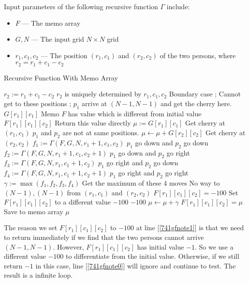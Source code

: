 Input parameters of the following recursive function $\Gamma$ include:
\begin{itemize}
\item $F$ --- The memo array
\item $G, N$ --- The input grid $N\times N$ grid
\item $r_1, c_1, c_2$ --- The position $(r_1, c_1)$ and $(r_2, c_2)$ of the two persons, where $r_2 = r_1+c_1-c_2$
\end{itemize}
\begin{algorithm}[H]
\caption{Recursive Function With Memo Array}
\label{741gf}
\begin{algorithmic}[1]
\State $r_2 := r_1+c_1-c_2$ \Comment $r_2$ is uniquely determined by $r_1,c_1,c_2$
 \Comment Boundary case
\State {};
\EndIf
{} \Comment Cannot get to these positions
\State {};
\EndIf
{} \Comment $p_1$ arrive at $(N-1, N-1)$ and get the cherry here.
\State \Return $G[r_1][c_1]$
\EndIf
{} \Comment Memo $F$ has value which is different from initial value \label{741gfnote0}
\State \Return $F[r_1][c_1][c_2]$ \Comment  Return this value directly
\EndIf
\State $\mu:=G[r_1][c_1]$ \Comment Get cherry at $(r_1, c_1)$
 \Comment $p_1$ and $p_2$ are not at same positions.
\State $\mu\gets \mu+G[r_2][c_2]$ \Comment Get cherry at $(r_2, c_2)$
\EndIf
\State $f_1 := \Gamma(F, G, N, r_1+1, c_1, c_2)$ \Comment $p_1$ go down  and $p_2$ go down
\State $f_2 := \Gamma(F, G, N, r_1+1, c_1, c_2+1)$ \Comment $p_1$ go down  and $p_2$ go right
\State $f_3 := \Gamma(F, G, N, r_1, c_1+1, c_2)$ \Comment $p_1$ go right  and $p_2$ go down
\State $f_4 := \Gamma(F, G, N, r_1, c_1+1, c_2+1)$ \Comment $p_1$ go right  and $p_2$ go right
\State $\gamma := \max(f_1,f_2,f_3,f_4)$ \Comment Get the maximum of these 4 moves
 \Comment No way to $(N-1), (N-1)$ from $(r_1, c_1)$ and $(r_2, c_2)$
\State $F[r_1][c_1][c_2] = -100$ \Comment Set $F[r_1][c_1][c_2]$ to a different value $-100$ \label{741gfnote1}
\State \Return $-100$
\EndIf
\State $\mu\gets \mu + \gamma$
\State $F[r_1][c_1][c_2] =\mu$ \Comment Save to memo array
\State \Return $\mu$
\EndFunction
\end{algorithmic}
\end{algorithm}
The reason we set $F[r_1][c_1][c_2]$ to $-100$ at line [\ref{741gfnote1}] is that we need to return immediately if we find that the two persons cannot arrive $(N-1, N-1)$. However, $F[r_1][c_1][c_2]$ has initial value $-1$. So we use a different value $-100$ to differentiate from the initial value. Otherwise, if we still return $-1$ in this case, line [\ref{741gfnote0}] will ignore and continue to test. The result is a infinite loop.
